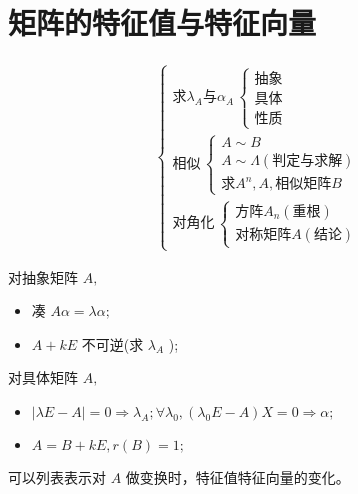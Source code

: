 \chapter{矩阵的特征值与特征向量}

\begin{equation*}
    \begin{aligned}
        \begin{cases}
        \textrm{求}\lambda_A\textrm{与}\alpha_A\,\begin{cases}
            \textrm{抽象}\\\textrm{具体}\\\textrm{性质}
        \end{cases}\\
        \textrm{相似}\,\begin{cases}
            A\sim B\\ A\sim \Lambda(\textrm{判定与求解})\\ 
            \textrm{求} A^n,A,\textrm{相似矩阵}B
        \end{cases}\\
        \textrm{对角化}\,\begin{cases}
            \textrm{方阵}A_n(\textrm{重根})\\ 
            \textrm{对称矩阵}A(\textrm{结论})
        \end{cases}
    \end{cases}
    \end{aligned}
\end{equation*}



对抽象矩阵 $ A, $ \begin{itemize}
    \item 凑 $ A\alpha = \lambda \alpha; $ 
    \item $ A + kE $ 不可逆(求 $ \lambda_A $ );
\end{itemize}

对具体矩阵 $ A, $ \begin{itemize}
    \item $ |\lambda E - A| = 0 \Rightarrow \lambda_A; \forall \lambda_0, (\lambda_0 E - A)X = 0\Rightarrow \alpha; $ 
    \item $ A = B + kE, r(B) = 1; $ 
\end{itemize}


可以列表表示对 $ A $ 做变换时，特征值特征向量的变化。

